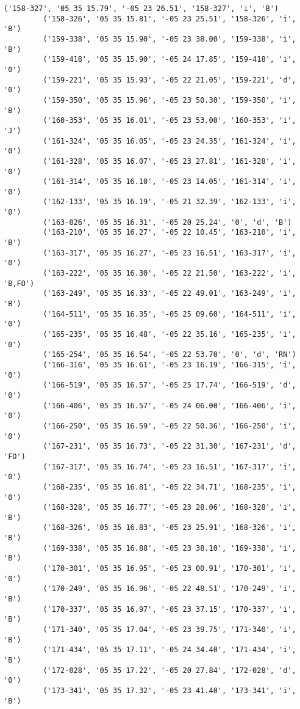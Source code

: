 \documentclass{article}
\begin{document}
\begin{Verbatim}[commandchars=\\\{\}]
         ('158-327', '05 35 15.79', '-05 23 26.51', '158-327', 'i', 'B')
         ('158-326', '05 35 15.81', '-05 23 25.51', '158-326', 'i', 'B')
         ('159-338', '05 35 15.90', '-05 23 38.00', '159-338', 'i', 'B')
         ('159-418', '05 35 15.90', '-05 24 17.85', '159-418', 'i', '0')
         ('159-221', '05 35 15.93', '-05 22 21.05', '159-221', 'd', '0')
         ('159-350', '05 35 15.96', '-05 23 50.30', '159-350', 'i', 'B')
         ('160-353', '05 35 16.01', '-05 23 53.00', '160-353', 'i', 'J')
         ('161-324', '05 35 16.05', '-05 23 24.35', '161-324', 'i', '0')
         ('161-328', '05 35 16.07', '-05 23 27.81', '161-328', 'i', '0')
         ('161-314', '05 35 16.10', '-05 23 14.05', '161-314', 'i', '0')
         ('162-133', '05 35 16.19', '-05 21 32.39', '162-133', 'i', '0')
         ('163-026', '05 35 16.31', '-05 20 25.24', '0', 'd', 'B')
         ('163-210', '05 35 16.27', '-05 22 10.45', '163-210', 'i', 'B')
         ('163-317', '05 35 16.27', '-05 23 16.51', '163-317', 'i', '0')
         ('163-222', '05 35 16.30', '-05 22 21.50', '163-222', 'i', 'B,FO')
         ('163-249', '05 35 16.33', '-05 22 49.01', '163-249', 'i', 'B')
         ('164-511', '05 35 16.35', '-05 25 09.60', '164-511', 'i', '0')
         ('165-235', '05 35 16.48', '-05 22 35.16', '165-235', 'i', '0')
         ('165-254', '05 35 16.54', '-05 22 53.70', '0', 'd', 'RN')
         ('166-316', '05 35 16.61', '-05 23 16.19', '166-315', 'i', '0')
         ('166-519', '05 35 16.57', '-05 25 17.74', '166-519', 'd', '0')
         ('166-406', '05 35 16.57', '-05 24 06.00', '166-406', 'i', '0')
         ('166-250', '05 35 16.59', '-05 22 50.36', '166-250', 'i', '0')
         ('167-231', '05 35 16.73', '-05 22 31.30', '167-231', 'd', 'FO')
         ('167-317', '05 35 16.74', '-05 23 16.51', '167-317', 'i', '0')
         ('168-235', '05 35 16.81', '-05 22 34.71', '168-235', 'i', '0')
         ('168-328', '05 35 16.77', '-05 23 28.06', '168-328', 'i', 'B')
         ('168-326', '05 35 16.83', '-05 23 25.91', '168-326', 'i', 'B')
         ('169-338', '05 35 16.88', '-05 23 38.10', '169-338', 'i', 'B')
         ('170-301', '05 35 16.95', '-05 23 00.91', '170-301', 'i', '0')
         ('170-249', '05 35 16.96', '-05 22 48.51', '170-249', 'i', 'B')
         ('170-337', '05 35 16.97', '-05 23 37.15', '170-337', 'i', 'B')
         ('171-340', '05 35 17.04', '-05 23 39.75', '171-340', 'i', 'B')
         ('171-434', '05 35 17.11', '-05 24 34.40', '171-434', 'i', 'B')
         ('172-028', '05 35 17.22', '-05 20 27.84', '172-028', 'd', '0')
         ('173-341', '05 35 17.32', '-05 23 41.40', '173-341', 'i', 'B')

\end{Verbatim}
\end{document}
